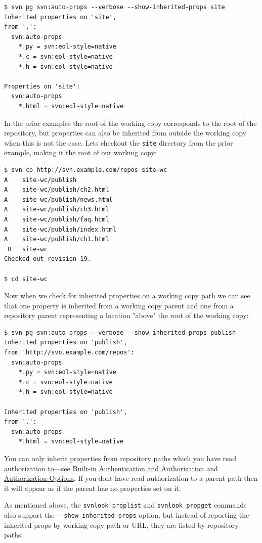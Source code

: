 \begin{verbatim}
$ svn pg svn:auto-props --verbose --show-inherited-props site
Inherited properties on 'site',
from '.':
  svn:auto-props
    *.py = svn:eol-style=native
    *.c = svn:eol-style=native
    *.h = svn:eol-style=native

Properties on 'site':
  svn:auto-props
    *.html = svn:eol-style=native
\end{verbatim}

In the prior examples the root of the working copy corresponds to the
root of the repository, but properties can also be inherited from
outside the working copy when this is not the case.
Let\textquotesingle s checkout the \texttt{site} directory from the
prior example, making it the root of our working copy:

\begin{verbatim}
$ svn co http://svn.example.com/repos site-wc
A    site-wc/publish
A    site-wc/publish/ch2.html
A    site-wc/publish/news.html
A    site-wc/publish/ch3.html
A    site-wc/publish/faq.html
A    site-wc/publish/index.html
A    site-wc/publish/ch1.html
 U   site-wc
Checked out revision 19.

$ cd site-wc
\end{verbatim}

Now when we check for inherited properties on a working copy path we can
see that one property is inherited from a working copy parent and one
from a repository parent representing a location "above" the root of the
working copy:

\begin{verbatim}
$ svn pg svn:auto-props --verbose --show-inherited-props publish
Inherited properties on 'publish',
from 'http://svn.example.com/repos':
  svn:auto-props
    *.py = svn:eol-style=native
    *.c = svn:eol-style=native
    *.h = svn:eol-style=native

Inherited properties on 'publish',
from '.':
  svn:auto-props
    *.html = svn:eol-style=native
\end{verbatim}

You can only inherit properties from repository paths which you have
read authorization to---see
\hyperref[svn.serverconfig.svnserve.auth]{Built-in Authentication and
Authorization} and \hyperref[svn.serverconfig.httpd.authz]{Authorization
Options}. If you don\textquotesingle t have read authorization to a
parent path then it will appear as if the parent has no properties set
on it.

As mentioned above, the \texttt{svnlook\ proplist} and
\texttt{svnlook\ propget} commands also support the
\texttt{-\/-show-inherited-props} option, but instead of reporting the
inherited props by working copy path or URL, they are listed by
repository paths:

